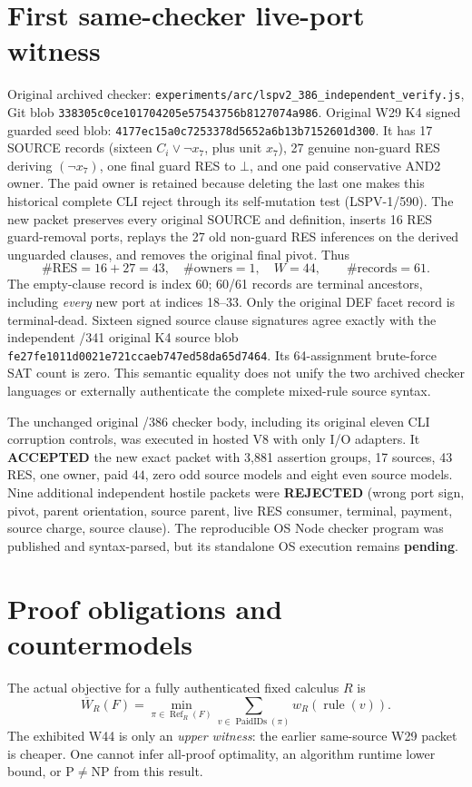 \documentclass[11pt]{article}
\begin{document}
\section*{First same-checker live-port witness}
Original archived checker:
\texttt{experiments/arc/lspv2\_386\_independent\_verify.js},
Git blob \texttt{338305c0ce101704205e57543756b8127074a986}.
Original W29 K4 signed guarded seed blob:
\texttt{4177ec15a0c7253378d5652a6b13b7152601d300}.
It has 17 SOURCE records (sixteen $C_i\vee\neg x_7$,
plus unit $x_7$), 27 genuine non-guard RES deriving
$(\neg x_7)$, one final guard RES to $\bot$, and one
paid conservative AND2 owner. The paid owner is
retained because deleting the last one makes this
historical complete CLI reject through its
self-mutation test (LSPV-1/590).
The new packet preserves every original SOURCE and
definition, inserts 16 RES guard-removal ports, replays
the 27 old non-guard RES inferences on the derived
unguarded clauses, and removes the original final pivot.
Thus
\[
 \#\mathrm{RES}=16+27=43,\quad
 \#\mathrm{owners}=1,\quad
 \boxed{W=44},\qquad \#\mathrm{records}=61.
\]
The empty-clause record is index 60; 60/61 records
are terminal ancestors, including \emph{every}
new port at indices 18--33. Only the original
DEF facet record is terminal-dead. Sixteen signed
source clause signatures agree exactly with the
independent /341 original K4 source blob
\texttt{fe27fe1011d0021e721ccaeb747ed58da65d7464}.
Its 64-assignment brute-force SAT count is zero.
This semantic equality does not unify the two
archived checker languages or externally authenticate
the complete mixed-rule source syntax.

The unchanged original /386 checker body, including
its original eleven CLI corruption controls, was
executed in hosted V8 with only I/O adapters.
It \textbf{ACCEPTED} the new exact packet with 3,881
assertion groups, 17 sources, 43 RES, one owner,
paid $44$, zero odd source models and eight even
source models. Nine additional independent hostile
packets were \textbf{REJECTED} (wrong port sign,
pivot, parent orientation, source parent, live RES
consumer, terminal, payment, source charge, source
clause). The reproducible OS Node checker program
was published and syntax-parsed, but its standalone
OS execution remains \textbf{pending}.

\section*{Proof obligations and countermodels}
The actual objective for a fully authenticated fixed
calculus $R$ is
\[
 \overline W_R(F)=\min_{\pi\in\operatorname{Ref}_R(F)}
    \sum_{v\in\operatorname{PaidIDs}(\pi)}w_R(\operatorname{rule}(v)).
\]
The exhibited W44 is only an \emph{upper witness}:
the earlier same-source W29 packet is cheaper.
One cannot infer all-proof optimality, an algorithm
runtime lower bound, or P$\neq$NP from this result.
\end{document}

